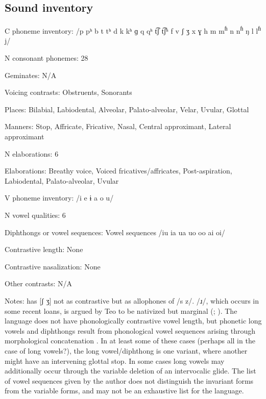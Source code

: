 {\subsection*{Sound inventory}
\begin{appendixdesc}

\item[C phoneme inventory:] /p pʰ b t tʰ d k kʰ ɡ q qʰ t͡ʃ t͡ʃʰ f v ʃ ʒ x ɣ h m m\textsuperscript{ɦ} n n\textsuperscript{ɦ} ŋ l l\textsuperscript{ɦ} j/

\item[N consonant phonemes:] 28

\item[Geminates:] N/A

\item[Voicing contrasts:] Obstruents, Sonorants

\item[Places:] Bilabial, Labiodental, Alveolar, Palato-alveolar, Velar, Uvular, Glottal

\item[Manners:] Stop, Affricate, Fricative, Nasal, Central approximant, Lateral approximant

\item[N elaborations:] 6

\item[Elaborations:] Breathy voice, Voiced fricatives/affricates, Post-aspiration, Labiodental, Palato-alveolar, Uvular

\item[V phoneme inventory:] /i e ɨ a o u/

\item[N vowel qualities:] 6

\item[Diphthongs or vowel sequences:] Vowel sequences /iu ia ua uo oo ai oi/

\item[Contrastive length:] None

\item[Contrastive nasalization:] None

\item[Other contrasts:] N/A

\item[Notes:] \citet{Sreedhar1980} has [ʃ ʒ] not as contrastive but as allophones of /s z/. /ɹ/, which occurs in some recent loans, is argued by Teo to be nativized but marginal (\citeyear[36]{Teo2009}; \citeyear[366]{Teo2012}). The language does not have phonologically contrastive vowel length, but phonetic long vowels and diphthongs result from phonological vowel sequences arising through morphological concatenation \citep[58--59]{Teo2009}. In at least some of these cases (perhaps all in the case of long vowels?), the long vowel/diphthong is one variant, where another might have an intervening glottal stop. In some cases long vowels may additionally occur through the variable deletion of an intervocalic glide. The list of vowel sequences given by the author does not distinguish the invariant forms from the variable forms, and may not be an exhaustive list for the language.
\end{appendixdesc}
}
